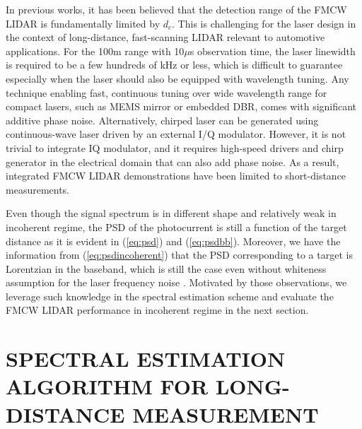 \documentclass{article}
\begin{document}
In previous works, it has been believed that the detection range of the FMCW LIDAR is fundamentally limited by $d_c$. This is challenging for the laser design in the context of long-distance, fast-scanning LIDAR relevant to automotive applications. For the 100m range with 10$\mu$s observation time, the laser linewidth is required to be a few hundreds of kHz or less, which is difficult to guarantee especially when the laser should also be equipped with wavelength tuning. Any technique enabling fast, continuous tuning over wide wavelength range for compact lasers, such as MEMS mirror or embedded DBR, comes with significant additive phase noise. Alternatively, chirped laser can be generated using continuous-wave laser driven by an external I/Q modulator. However, it is not trivial to integrate IQ modulator, and it requires high-speed drivers and chirp generator in the electrical domain that can also add phase noise. As a result, integrated FMCW LIDAR demonstrations have been limited to short-distance measurements.


Even though the signal spectrum is in different shape and relatively weak in incoherent regime, the PSD of the photocurrent is still a function of the target distance as it is evident in (\ref{eq:psd}) and (\ref{eq:psdbb}). Moreover, we have the information from (\ref{eq:psdincoherent}) that the PSD corresponding to a target is Lorentzian in the baseband, which is still the case even without whiteness assumption for the laser frequency noise \cite{C2}. Motivated by those observations, we leverage such knowledge in the spectral estimation scheme and evaluate the FMCW LIDAR performance in incoherent regime in the next section.



\section{SPECTRAL ESTIMATION ALGORITHM FOR LONG-DISTANCE MEASUREMENT}
\label{sec:algorithm}
\end{document}
